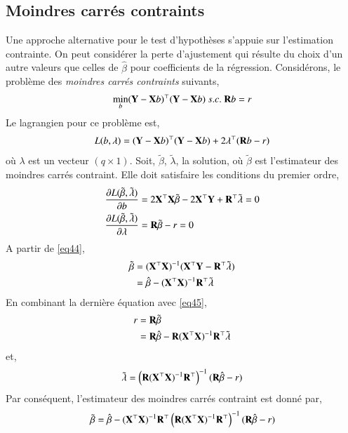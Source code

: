 \documentclass[10pt, reqno]{amsart}
\begin{document}
\subsection{Moindres carrés contraints}
Une approche alternative pour le test d'hypothèses s'appuie sur l'estimation contrainte. On peut considérer la perte d'ajustement qui résulte du choix d'un autre valeurs que celles de $\hat{\beta}$ pour coefficients de la régression. Considérons, le problème des \emph{moindres carrés contraints} suivants,
\begin{align*}
\min_b(\mathbf Y-\mathbf X b)^\top (\mathbf Y-\mathbf X b) \ s.c. \ \mathbf{R}b=r
\end{align*}
Le lagrangien pour ce problème est,
\begin{align*}
L(b, \lambda) = (\mathbf Y-\mathbf X b)^\top (\mathbf Y-\mathbf X b) + 2\lambda^\top(\mathbf{R}b-r)
\end{align*}
où $\lambda$ est un vecteur $(q\times 1)$. Soit, $\tilde{\beta}$, $\tilde{\lambda}$, la solution, où $\tilde{\beta}$ est l'estimateur des moindres carrés contraint. Elle doit satisfaire les conditions du premier ordre,
\begin{align}
\frac{\partial L(\tilde{\beta}, \tilde{\lambda})}{\partial b} &= 2\mathbf X^\top\mathbf X\tilde{\beta} - 2\mathbf X^\top\mathbf Y + \mathbf{R}^\top\tilde{\lambda} = 0
\label{eq44}\\
\frac{\partial L(\tilde{\beta}, \tilde{\lambda})}{\partial \lambda} &=\mathbf{R}\tilde{\beta} -r = 0
\label{eq45}
\end{align}
A partir de \eqref{eq44},
\begin{align*}
\tilde{\beta} & = (\mathbf X^\top\mathbf X)^{-1}(\mathbf X^\top\mathbf Y - \mathbf{R}^\top\tilde{\lambda})\\
&=\hat{\beta} - (\mathbf X^\top\mathbf X)^{-1}\mathbf{R}^\top\tilde{\lambda}
\end{align*}
En combinant la dernière équation avec \eqref{eq45},
\begin{align*}
r &=\mathbf{R}\tilde{\beta}\\
&=\mathbf{R}\hat{\beta} - \mathbf{R}(\mathbf X^\top\mathbf X)^{-1}\mathbf{R}^\top\tilde{\lambda} 
\end{align*}
et,
\begin{align*}
\tilde{\lambda} = \left(\mathbf{R}(\mathbf X^\top\mathbf X)^{-1}\mathbf{R}^\top\right)^{-1}(\mathbf{R}\hat{\beta}-r)
\end{align*}
Par conséquent, l'estimateur des moindres carrés contraint est donné par,
\begin{align*}
\tilde{\beta} = \hat{\beta} - (\mathbf X^\top\mathbf X)^{-1}\mathbf{R}^\top\left(\mathbf{R}(\mathbf X^\top\mathbf X)^{-1}\mathbf{R}^\top\right)^{-1}(\mathbf{R}\hat{\beta}-r)
\end{align*}
\end{document}
